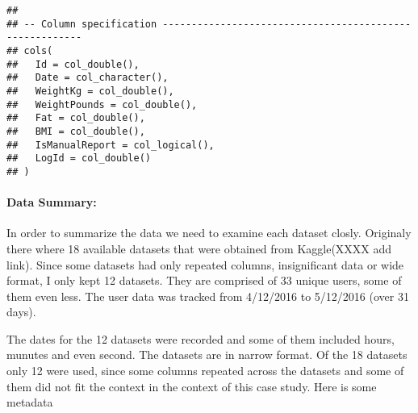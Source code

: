 \documentclass[
]{article}
\begin{document}
\begin{verbatim}
## 
## -- Column specification --------------------------------------------------------
## cols(
##   Id = col_double(),
##   Date = col_character(),
##   WeightKg = col_double(),
##   WeightPounds = col_double(),
##   Fat = col_double(),
##   BMI = col_double(),
##   IsManualReport = col_logical(),
##   LogId = col_double()
## )
\end{verbatim}

\hypertarget{data-summary}{%
\paragraph{Data Summary:}\label{data-summary}}

In order to summarize the data we need to examine each dataset closly.
Originaly there where 18 available datasets that were obtained from
Kaggle(XXXX add link). Since some datasets had only repeated columns,
insignificant data or wide format, I only kept 12 datasets. They are
comprised of 33 unique users, some of them even less. The user data was
tracked from 4/12/2016 to 5/12/2016 (over 31 days).

The dates for the 12 datasets were recorded and some of them included
hours, munutes and even second. The datasets are in narrow format. Of
the 18 datasets only 12 were used, since some columns repeated across
the datasets and some of them did not fit the context in the context of
this case study. Here is some metadata
\end{document}
